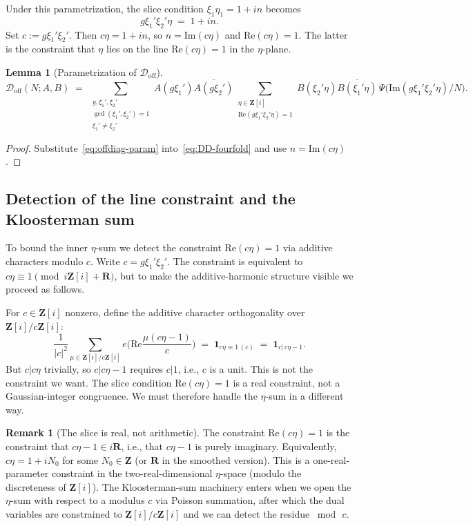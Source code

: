 \documentclass[11pt]{article}
\newtheorem{lemma}[theorem]{Lemma}
\theoremstyle{definition}
\newtheorem{remark}[theorem]{Remark}
\newcommand{\Z}{\mathbf{Z}}
\newcommand{\R}{\mathbf{R}}
\newcommand{\Zi}{\Z[i]}
\renewcommand{\Re}{\mathrm{Re}}
\renewcommand{\Im}{\mathrm{Im}}
\begin{document}
Under this parametrization, the slice condition $\xi_1\eta_1=1+in$ becomes
\[
g\xi_1'\xi_2'\eta\;=\;1+in.
\]
Set $c:=g\xi_1'\xi_2'$. Then $c\eta=1+in$, so $n=\Im(c\eta)$ and $\Re(c\eta)=1$. The latter is the constraint that $\eta$ lies on the line $\Re(c\eta)=1$ in the $\eta$-plane.

\begin{lemma}[Parametrization of $\mathcal{D}_{\mathrm{off}}$]\label{lem:offdiag-param}
\[
\mathcal{D}_{\mathrm{off}}(N;A,B)\;=\;\sum_{\substack{g,\xi_1',\xi_2'\\ \gcd(\xi_1',\xi_2')=1\\ \xi_1'\ne\xi_2'}}\!\!\!A(g\xi_1')\overline{A(g\xi_2')}\sum_{\substack{\eta\in\Zi\\ \Re(g\xi_1'\xi_2'\eta)=1}}B(\xi_2'\eta)\overline{B(\xi_1'\eta)}\,\Psi\!\bigl(\Im(g\xi_1'\xi_2'\eta)/N\bigr).
\]
\end{lemma}

\begin{proof}
Substitute~\eqref{eq:offdiag-param} into~\eqref{eq:DD-fourfold} and use $n=\Im(c\eta)$.
\end{proof}

\subsection{Detection of the line constraint and the Kloosterman sum}

To bound the inner $\eta$-sum we detect the constraint $\Re(c\eta)=1$ via additive characters modulo $c$. Write $c=g\xi_1'\xi_2'$. The constraint is equivalent to $c\eta\equiv 1\pmod{i\Zi+\R}$, but to make the additive-harmonic structure visible we proceed as follows.

For $c\in\Zi$ nonzero, define the additive character orthogonality over $\Zi/c\Zi$:
\[
\frac{1}{|c|^2}\sum_{\mu\in\Zi/c\Zi}e\!\Big(\Re\frac{\mu(c\eta-1)}{c}\Big)\;=\;\mathbf{1}_{c\eta\equiv 1\,(c)}\;=\;\mathbf{1}_{c|\,c\eta-1}.
\]
But $c|c\eta$ trivially, so $c|c\eta-1$ requires $c|1$, i.e., $c$ is a unit. This is not the constraint we want. The slice condition $\Re(c\eta)=1$ is a real constraint, not a Gaussian-integer congruence. We must therefore handle the $\eta$-sum in a different way.

\begin{remark}[The slice is real, not arithmetic]\label{rem:slice-real}
The constraint $\Re(c\eta)=1$ is the constraint that $c\eta-1\in i\R$, i.e., that $c\eta-1$ is purely imaginary. Equivalently, $c\eta=1+iN_0$ for some $N_0\in\Z$ (or $\R$ in the smoothed version). This is a one-real-parameter constraint in the two-real-dimensional $\eta$-space (modulo the discreteness of $\Zi$). The Kloosterman-sum machinery enters when we open the $\eta$-sum with respect to a modulus $c$ via Poisson summation, after which the dual variables are constrained to $\Zi/c\Zi$ and we can detect the residue $\bmod\,c$.
\end{remark}
\end{document}

